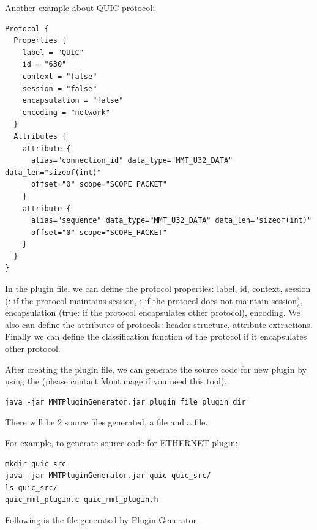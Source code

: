 Another example about QUIC protocol:

\begin{lstlisting}[style=Cpp]
Protocol {
  Properties {
    label = "QUIC"
    id = "630"
    context = "false"
    session = "false"
    encapsulation = "false"
    encoding = "network"
  }
  Attributes {
    attribute {
      alias="connection_id" data_type="MMT_U32_DATA" data_len="sizeof(int)" 
      offset="0" scope="SCOPE_PACKET"
    }
    attribute {
      alias="sequence" data_type="MMT_U32_DATA" data_len="sizeof(int)" 
      offset="0" scope="SCOPE_PACKET"
    }
  }
}
\end{lstlisting}

In the plugin file, we can define the protocol properties: label, id, context, session (\true: if the protocol maintains session, \false: if the protocol does not maintain session), encapsulation (true: if the protocol encapsulates other protocol), encoding. We also can define the attributes of protocols: header structure, attribute extractions. Finally we can define the classification function of the protocol if it encapsulates other protocol.

After creating the plugin file, we can generate the source code for new plugin by using the  (please contact Montimage if you need this tool).

\begin{lstlisting}[style=BASH]
java -jar MMTPluginGenerator.jar plugin_file plugin_dir
\end{lstlisting}

There will be 2 source files generated, a  file and a  file.

For example, to generate source code for ETHERNET plugin:

\begin{lstlisting}[style=BASH]
mkdir quic_src
java -jar MMTPluginGenerator.jar quic quic_src/
ls quic_src/
quic_mmt_plugin.c quic_mmt_plugin.h
\end{lstlisting}

Following is the  file generated by Plugin Generator


